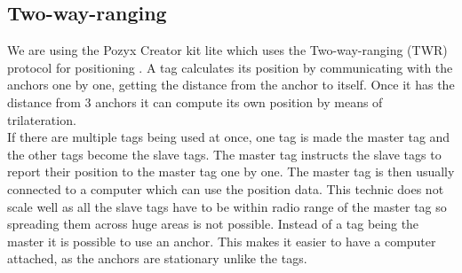 \subsection{Two-way-ranging}
We are using the Pozyx Creator kit lite which uses the Two-way-ranging (TWR) protocol for positioning \cite{pozyx-Positioning}.
A tag calculates its position by communicating with the anchors one by one, getting the distance from the anchor to itself.
Once it has the distance from 3 anchors it can compute its own position by means of trilateration.
\\
If there are multiple tags being used at once, one tag is made the master tag and the other tags become the slave tags.
The master tag instructs the slave tags to report their position to the master tag one by one.
The master tag is then usually connected to a computer which can use the position data.
This technic does not scale well as all the slave tags have to be within radio range of the master tag so spreading them across huge areas is not possible.
Instead of a tag being the master it is possible to use an anchor.
This makes it easier to have a computer attached, as the anchors are stationary unlike the tags.
